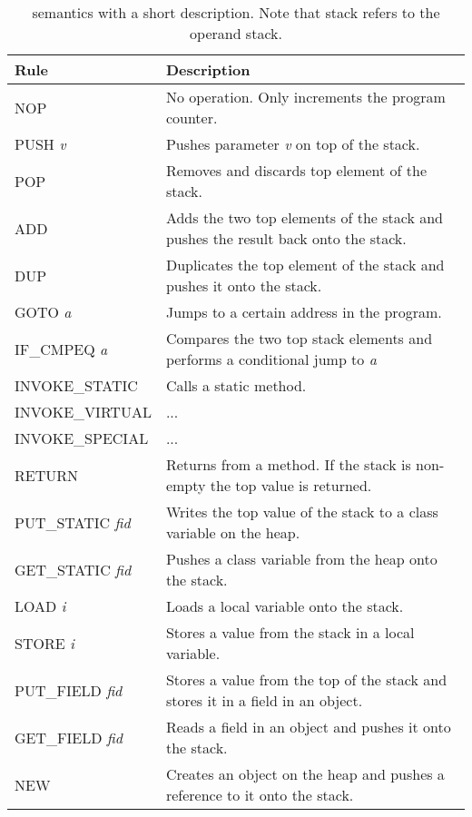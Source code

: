 \section{\jcl}
\begin{table}[H]
\centering
\label{tab:instr}
\begin{tabular}{p{}|p{}}
\textbf{Rule}			  & \textbf{Description} \\ \hline
NOP             		  & No operation. Only increments the program counter. \\ \hline
PUSH \textit{v}           & Pushes parameter \textit{v} on top of the stack. \\ \hline
POP             		  & Removes and discards top element of the stack.\\ \hline
ADD             		  & Adds the two top elements of the stack and pushes the result back onto the stack.  \\ \hline
DUP             		  & Duplicates the top element of the stack and pushes it onto the stack. \\ \hline
GOTO \textit{a}           & Jumps to a certain address in the program.  \\ \hline
IF\_CMPEQ \textit{a}   	  & Compares the two top stack elements and performs a conditional jump to \textit{a}  \\ \hline
INVOKE\_STATIC     		  & Calls a static method.  \\ \hline
INVOKE\_VIRTUAL 		  & ...  \\ \hline
INVOKE\_SPECIAL			  & ...  \\ \hline
RETURN                    & Returns from a method. If the stack is non-empty the top value is returned.   \\ \hline
PUT\_STATIC \textit{fid}  & Writes the top value of the stack to a class variable on the heap.  \\ \hline
GET\_STATIC \textit{fid}  & Pushes a class variable from the heap onto the stack. \\ \hline
LOAD \textit{i}           & Loads a local variable onto the stack.  \\ \hline
STORE \textit{i}          & Stores a value from the stack in a local variable.\\ \hline
PUT\_FIELD \textit{fid}   & Stores a value from the top of the stack and stores it in a field in an object.   \\ \hline
GET\_FIELD \textit{fid}	  & Reads a field in an object and pushes it onto the stack. \\ \hline
NEW   		              & Creates an object on the heap and pushes a reference to it onto the stack.  \\ \hline  
\end{tabular}
\caption{\jcl semantics with a short description. Note that stack refers to the operand stack.}
\end{table}
